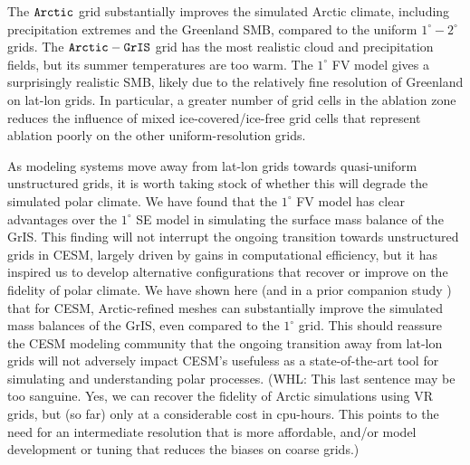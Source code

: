 \documentclass[draft]{agujournal2019}
\begin{document}
The $\tt Arctic$ grid substantially improves the simulated Arctic climate, including precipitation extremes and the Greenland SMB, compared to the uniform $1^{\circ}-2^{\circ}$ grids. The $\tt Arctic-GrIS$ grid has the most realistic cloud and precipitation fields, but its summer temperatures are too warm. The $1^{\circ}$ FV model gives a surprisingly realistic SMB, likely due to the relatively fine resolution of Greenland on lat-lon grids. In particular, a greater number of grid cells in the ablation zone reduces the influence of mixed ice-covered/ice-free grid cells that represent ablation poorly on the other uniform-resolution grids.

As modeling systems move away from lat-lon grids towards quasi-uniform unstructured grids, it is worth taking stock of whether this will degrade the simulated polar climate. We have found that the $1^{\circ}$ FV model has clear advantages over the $1^{\circ}$ SE model in simulating the surface mass balance of the GrIS. This finding will not interrupt the ongoing transition towards unstructured grids in CESM, largely driven by gains in computational efficiency, but it has inspired us to develop alternative configurations that recover or improve on the fidelity of polar climate. We have shown here (and in a prior companion study \cite{VETAL2018TC}) that for CESM, Arctic-refined meshes can substantially improve the simulated mass balances of the GrIS, even compared to the $1^{\circ}$ grid. This should reassure the CESM modeling community that the ongoing transition away from lat-lon grids will not adversely impact CESM's usefuless as a state-of-the-art tool for simulating and understanding polar processes.
{\color{blue} (WHL: This last sentence may be too sanguine.  Yes, we can recover the fidelity of Arctic simulations using VR grids, but (so far) only at a considerable cost in cpu-hours.  This points to the need for an intermediate resolution that is more affordable, and/or model development or tuning that reduces the biases on coarse grids.)}{\color{purple}{Andrew - Maybe better to just state that higher resolution is better: 1deg better than 2deg FV, and ne30 is coarser than 1deg at Greenland latitudes so it's worse. But VR has higher resolution so SR-VR is better. It's all about resolution.}}
\end{document}
